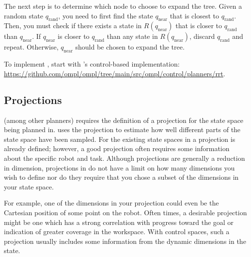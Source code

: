 \documentclass{comp450}
\begin{document}
The next step is to determine which node to choose to expand the tree.
Given a random state $q_\text{rand}$, you need to first find the state $q_\text{near}$ that is closest to $q_\text{rand}$.
Then, you must check if there exists a state in $R(q_\text{near})$ that is closer to $q_\text{rand}$ than $q_\text{near}$.
If $q_\text{near}$ is closer to $q_\text{rand}$ than any state in $R(q_\text{near})$, discard $q_\text{rand}$ and repeat.
Otherwise, $q_\text{near}$ should be chosen to expand the tree.


To implement , start with \ompl's control-based  implementation:
\url{https://github.com/ompl/ompl/tree/main/src/ompl/control/planners/rrt}.

\subsection*{Projections}
 (among other planners) requires the definition of a projection for the state space being planned in.
 uses the projection to estimate how well different parts of the state space have been sampled.
For the existing state spaces in \ompl a projection is already defined; however, a good projection often requires some information about the specific robot and task.
Although projections are generally a reduction in dimension, projections in \ompl do not have a limit on how many dimensions you wish to define nor do they require that you chose a subset of the dimensions in your state space.

For example, one of the dimensions in your projection could even be the Cartesian position of some point on the robot.
Often times, a desirable projection might be one which has a strong correlation with progress toward the goal or indication of greater coverage in the workspace.
With control spaces, such a projection usually includes some information from the dynamic dimensions in the state.
\end{document}
